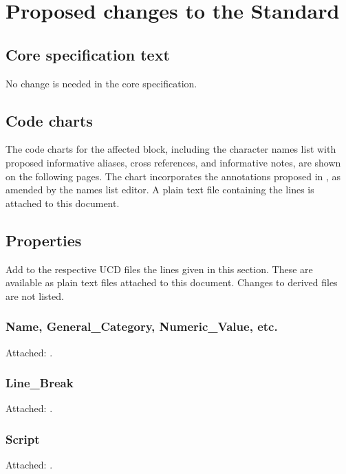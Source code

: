 \documentclass[10pt, a4paper, twoside]{article}
\begin{document}
\section{Proposed changes to the Standard}
\label{proposal}
\subsection{Core specification text}

No change is needed in the core specification.
\subsection{Code charts}
The code charts for the affected block,
including the character names list with proposed informative aliases, cross references, and informative notes,
are shown on the following pages.
The chart incorporates the annotations proposed in \cite{L2/24-239},
as amended by the names list editor.
A plain text file containing the
 lines is
attached to this document.
\vspace{0pt plus 0.5fill}
\begin{center}{}\end{center}
\vfill

\subsection{Properties}
\label{properties}
Add to the respective UCD files the lines given in this section.
These are available as plain text files attached to this document.
Changes to derived files are not listed.
\subsubsection{Name, General\_Category, Numeric\_Value, etc.}
Attached: .
\subsubsection{Line\_Break}
Attached: .
\subsubsection{Script}
Attached: .
\end{document}
